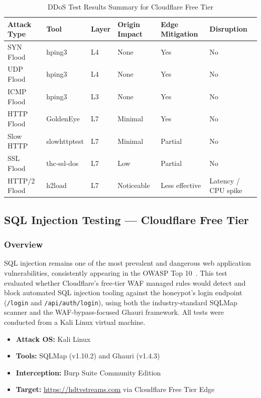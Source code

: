 \documentclass[12pt, a4paper]{report}   %
\begin{document}
\begin{table}[H]
  \centering
  \caption{DDoS Test Results Summary for Cloudflare Free Tier}
  \label{tab:cf-ddos-summary}
  \begin{tabularx}{\textwidth}{lllXXX}
    \toprule
    \textbf{Attack Type} & \textbf{Tool} & \textbf{Layer}
      & \textbf{Origin Impact} & \textbf{Edge Mitigation} 
      & \textbf{Disruption} \\
    \midrule
    SYN Flood    & hping3       & L4 & None       & Yes            & No \\
    UDP Flood    & hping3       & L4 & None       & Yes            & No \\
    ICMP Flood   & hping3       & L3 & None       & Yes            & No \\
    HTTP Flood   & GoldenEye    & L7 & Minimal    & Yes            & No \\
    Slow HTTP    & slowhttptest & L7 & Minimal    & Partial        & No \\
    SSL Flood    & thc-ssl-dos  & L7 & Low        & Partial        & No \\
    HTTP/2 Flood & h2load       & L7 & Noticeable & Less effective 
      & Latency / CPU spike \\
    \bottomrule
  \end{tabularx}
\end{table}

\subsection{SQL Injection Testing --- Cloudflare Free Tier}
\label{sec:cf-sqli}

\subsubsection{Overview}

SQL injection remains one of the most prevalent and dangerous web application
vulnerabilities, consistently appearing in the OWASP Top 10~\cite{owasp-waf}.
This test evaluated whether Cloudflare's free-tier WAF managed rules would detect
and block automated SQL injection tooling against the honeypot's login endpoint
(\texttt{/login} and \texttt{/api/auth/login}), using both the industry-standard
SQLMap scanner and the WAF-bypass-focused Ghauri framework. All tests were conducted
from a Kali Linux virtual machine.

\begin{itemize}
  \item \textbf{Attack OS:} Kali Linux
  \item \textbf{Tools:} SQLMap (v1.10.2) and Ghauri (v1.4.3)
  \item \textbf{Interception:} Burp Suite Community Edition~\cite{burpsuite}
  \item \textbf{Target:} \url{https://hdtvstreams.com} via Cloudflare Free Tier Edge
\end{itemize}
\end{document}

